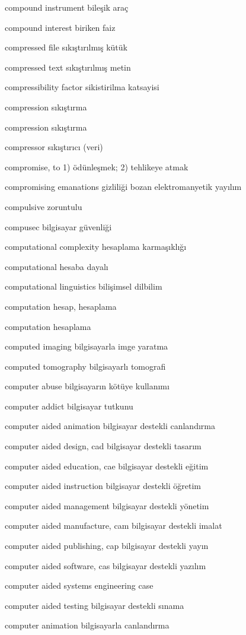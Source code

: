 \documentclass[12pt,fleqn]{article}\usepackage{../../common}
\begin{document}
compound instrument bileşik araç

compound interest biriken faiz

compressed file sıkıştırılmış kütük

compressed text sıkıştırılmış metin

compressibility factor sikistirilma katsayisi

compression sıkıştırma

compression sıkıştırma

compressor sıkıştırıcı (veri)

compromise, to 1) ödünleşmek; 2) tehlikeye atmak

compromising emanations gizliliği bozan elektromanyetik yayılım

compulsive zoruntulu

compusec bilgisayar güvenliği

computational complexity hesaplama karmaşıklığı

computational hesaba dayalı

computational linguistics bilişimsel dilbilim

computation hesap, hesaplama

computation hesaplama

computed imaging bilgisayarla imge yaratma

computed tomography bilgisayarlı tomografi

computer abuse bilgisayarın kötüye kullanımı

computer addict bilgisayar tutkunu

computer aided animation bilgisayar destekli canlandırma

computer aided design, cad bilgisayar destekli tasarım

computer aided education, cae bilgisayar destekli eğitim

computer aided instruction bilgisayar destekli öğretim

computer aided management bilgisayar destekli yönetim

computer aided manufacture, cam bilgisayar destekli imalat

computer aided publishing, cap bilgisayar destekli yayın

computer aided software, cas bilgisayar destekli yazılım

computer aided systems engineering case

computer aided testing bilgisayar destekli sınama

computer animation bilgisayarla canlandırma
\end{document}
